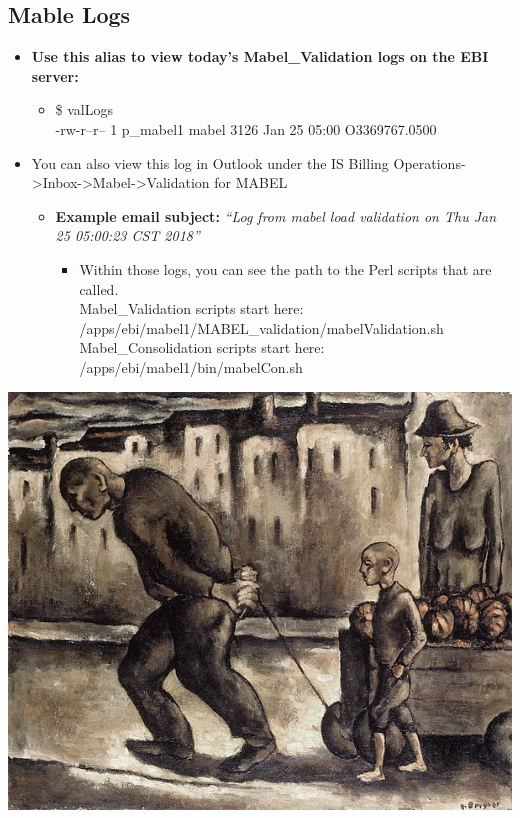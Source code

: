 \documentclass[12pt,twoside]{article}
\begin{document}
\subsection{Mable Logs}
\label{sec:orgheadline59}
\begin{itemize}
\item \textbf{Use this alias to view today’s Mabel\_Validation logs on the EBI server:}
\begin{itemize}
\item{}\$ valLogs\\
-rw-r--r-- 1 p\_mabel1 mabel 3126 Jan 25 05:00 O3369767.0500
\end{itemize}
\item You can also view this log in Outlook under the IS Billing Operations->Inbox->Mabel->Validation for MABEL
\begin{itemize}
\item \textbf{Example email subject:} \emph{“Log from mabel load validation on Thu Jan 25 05:00:23 CST 2018”}
\begin{itemize}
\item Within those logs, you can see the path to the Perl scripts that are called. \\
Mabel\_Validation scripts start here:\\
/apps/ebi/mabel1/MABEL\_validation/mabelValidation.sh\\
Mabel\_Consolidation scripts start here:\\
/apps/ebi/mabel1/bin/mabelCon.sh
\end{itemize}
\end{itemize}
\end{itemize}

\includegraphics[width=16cm]{Pictures/workingfamily.jpg}
\newpage
\end{document}
